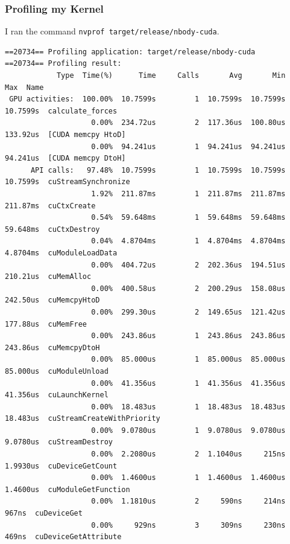 \begin{frame}[fragile]
\frametitle{Profiling my Kernel}

I ran the command \texttt{nvprof target/release/nbody-cuda}.

{\tiny
\begin{verbatim}
==20734== Profiling application: target/release/nbody-cuda
==20734== Profiling result:
            Type  Time(%)      Time     Calls       Avg       Min       Max  Name
 GPU activities:  100.00%  10.7599s         1  10.7599s  10.7599s  10.7599s  calculate_forces
                    0.00%  234.72us         2  117.36us  100.80us  133.92us  [CUDA memcpy HtoD]
                    0.00%  94.241us         1  94.241us  94.241us  94.241us  [CUDA memcpy DtoH]
      API calls:   97.48%  10.7599s         1  10.7599s  10.7599s  10.7599s  cuStreamSynchronize
                    1.92%  211.87ms         1  211.87ms  211.87ms  211.87ms  cuCtxCreate
                    0.54%  59.648ms         1  59.648ms  59.648ms  59.648ms  cuCtxDestroy
                    0.04%  4.8704ms         1  4.8704ms  4.8704ms  4.8704ms  cuModuleLoadData
                    0.00%  404.72us         2  202.36us  194.51us  210.21us  cuMemAlloc
                    0.00%  400.58us         2  200.29us  158.08us  242.50us  cuMemcpyHtoD
                    0.00%  299.30us         2  149.65us  121.42us  177.88us  cuMemFree
                    0.00%  243.86us         1  243.86us  243.86us  243.86us  cuMemcpyDtoH
                    0.00%  85.000us         1  85.000us  85.000us  85.000us  cuModuleUnload
                    0.00%  41.356us         1  41.356us  41.356us  41.356us  cuLaunchKernel
                    0.00%  18.483us         1  18.483us  18.483us  18.483us  cuStreamCreateWithPriority
                    0.00%  9.0780us         1  9.0780us  9.0780us  9.0780us  cuStreamDestroy
                    0.00%  2.2080us         2  1.1040us     215ns  1.9930us  cuDeviceGetCount
                    0.00%  1.4600us         1  1.4600us  1.4600us  1.4600us  cuModuleGetFunction
                    0.00%  1.1810us         2     590ns     214ns     967ns  cuDeviceGet
                    0.00%     929ns         3     309ns     230ns     469ns  cuDeviceGetAttribute
\end{verbatim}
}

\end{frame}


